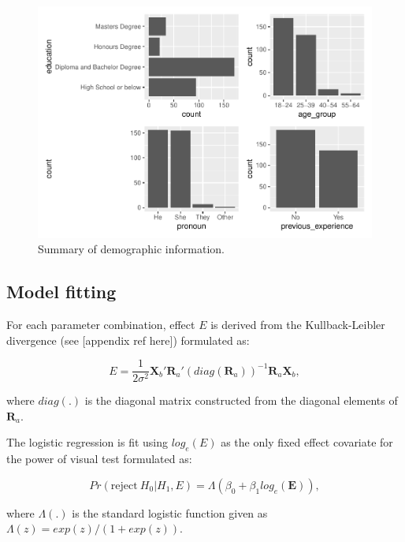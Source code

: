 \documentclass[]{interact}
\theoremstyle{plain}%
\theoremstyle{definition}
\theoremstyle{remark}
\begin{document}
\begin{figure}
\centering
\includegraphics{paper_comparison_files/figure-latex/demographic-summary-plot-1.pdf}
\caption{Summary of demographic information.
\label{fig:demographic-summary-plot}}
\end{figure}

\hypertarget{model-fitting}{%
\subsection{Model fitting}\label{model-fitting}}

For each parameter combination, effect \(E\) is derived from the
Kullback-Leibler divergence (see {[}appendix ref here{]}) formulated as:

\begin{equation} \label{eq:effect-size-ex1}
E = \frac{1}{2\sigma^2}\boldsymbol{X}_b'\boldsymbol{R}_a'(diag(\boldsymbol{R}_a))^{-1}\boldsymbol{R}_a\boldsymbol{X}_b,
\end{equation}

where \(diag(.)\) is the diagonal matrix constructed from the diagonal
elements of \(\boldsymbol{R}_a\).

The logistic regression is fit using \(log_e(E)\) as the only fixed
effect covariate for the power of visual test formulated as:

\begin{equation} \label{eq:logistic-regression-1-1}
Pr(\text{reject}~H_0|H_1,E) = \Lambda(\beta_0 + \beta_1 log_e(\boldsymbol{E})),
\end{equation}

where \(\Lambda(.)\) is the standard logistic function given as
\(\Lambda(z) = exp(z)/(1+exp(z))\).
\end{document}
